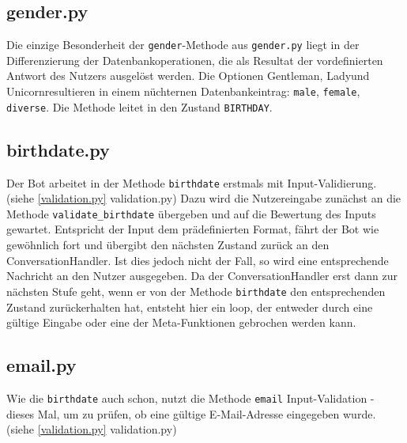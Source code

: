        \subsection{gender.py} \label{gender.py}
                Die einzige Besonderheit der \verb|gender|-Methode aus \verb|gender.py| liegt in der Differenzierung der Datenbankoperationen, die als Resultat der vordefinierten Antwort des Nutzers ausgelöst werden. Die Optionen \glqq Gentleman\grqq, \glqq Lady\grqq und \glqq Unicorn\grqq resultieren in einem nüchternen Datenbankeintrag: \verb|male|, \verb|female|, \verb|diverse|. Die Methode leitet in den Zustand \verb|BIRTHDAY|.
            
        

        \subsection{birthdate.py} \label{birthdate.py}
                Der Bot arbeitet in der Methode \verb|birthdate| erstmals mit Input-Validierung. (siehe \ref{validation.py} validation.py) Dazu wird die Nutzereingabe zunächst an die Methode \verb|validate_birthdate| übergeben und auf die Bewertung des Inputs gewartet. Entspricht der Input dem prädefinierten Format, fährt der Bot wie gewöhnlich fort und übergibt den nächsten Zustand zurück an den ConversationHandler. Ist dies jedoch nicht der Fall, so wird eine entsprechende Nachricht an den Nutzer ausgegeben. Da der ConversationHandler erst dann zur nächsten Stufe geht, wenn er von der Methode \verb|birthdate| den entsprechenden Zustand zurückerhalten hat, entsteht hier ein loop, der entweder durch eine gültige Eingabe oder eine der Meta-Funktionen gebrochen werden kann.
        
        
        \subsection{email.py} \label{email.py}
                Wie die \verb|birthdate| auch schon, nutzt die Methode \verb|email| Input-Validation - dieses Mal, um zu prüfen, ob eine gültige E-Mail-Adresse eingegeben wurde. (siehe \ref{validation.py} validation.py)

